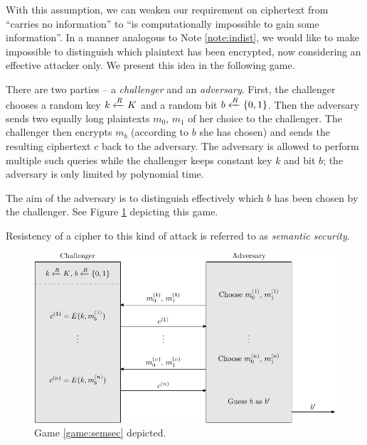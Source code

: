 With this assumption, we can weaken our requirement on ciphertext from ``carries no information'' to ``is computationally impossible to gain some information''. In a manner analogous to Note \ref{note:indist}, we would like to make impossible to distinguish which plaintext has been encrypted, now considering an effective attacker only. We present this idea in the following game.

\begin{game}
\label{game:semsec}
	There are two parties -- a {\em challenger} and an {\em adversary}. First, the challenger chooses a random key $k\xleftarrow{R} K$ and a random bit $b\xleftarrow{R}\{0,1\}$. Then the adversary sends two equally long plaintexts $m_0$, $m_1$ of her choice to the challenger. The challenger then encrypts $m_b$ (according to $b$ she has chosen) and sends the resulting ciphertext $c$ back to the adversary. The adversary is allowed to perform multiple such queries while the challenger keeps constant key $k$ and bit $b$; the adversary is only limited by polynomial time.
	
	The aim of the adversary is to distinguish effectively which $b$ has been chosen by the challenger. See Figure \ref{fig:semsecgame} depicting this game.
\end{game}

\begin{note}
\label{note:semsec}
	Resistency of a cipher to this kind of attack is referred to as {\em semantic security}.
\end{note}

\begin{figure}[H]
\begin{center}
	\includegraphics{./figures/game_semsec/game_semsec-1.pdf}
	\caption{Game \ref{game:semsec} depicted.}
	\label{fig:semsecgame}
\end{center}
\end{figure}

